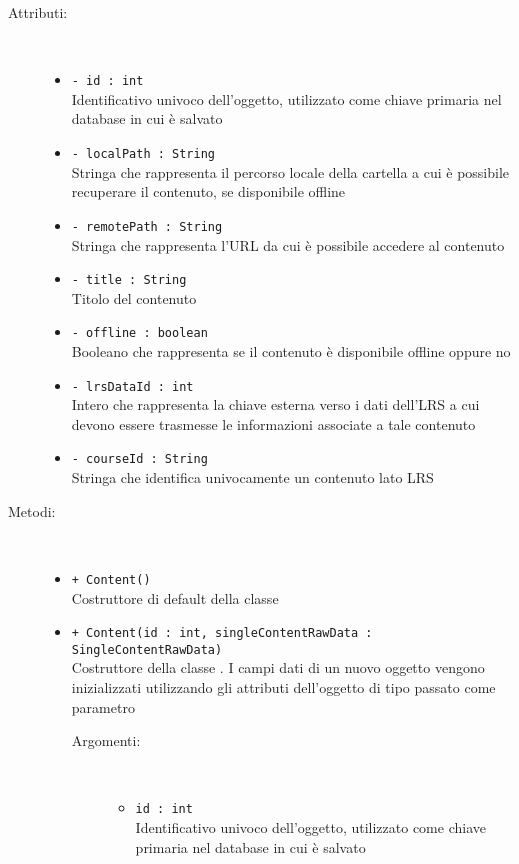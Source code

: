 \documentclass[../Tesi.tex]{subfiles}
\begin{document}
		\begin{description}
			\item[Attributi:] \
			\begin{itemize}
				\item \texttt{- id : int}\\
				Identificativo univoco dell'oggetto, utilizzato come chiave primaria nel database in cui è salvato

				\item \texttt{- localPath : String}\\
				Stringa che rappresenta il percorso locale della cartella a cui è possibile recuperare il contenuto, se disponibile offline

				\item \texttt{- remotePath : String}\\
				Stringa che rappresenta l'URL da cui è possibile accedere al contenuto

				\item \texttt{- title : String}\\
				Titolo del contenuto

				\item \texttt{- offline : boolean}\\
				Booleano che rappresenta se il contenuto è disponibile offline oppure no

				\item \texttt{- lrsDataId : int}\\
				Intero che rappresenta la chiave esterna verso i dati dell'LRS a cui devono essere trasmesse le informazioni associate a tale contenuto

				\item \texttt{- courseId : String}\\
				Stringa che identifica univocamente un contenuto lato LRS
			\end{itemize}

			\item[Metodi:] \
			\begin{itemize}
				\item \texttt{+ Content()}\\
				Costruttore di default della classe 

				\item \texttt{+ Content(id : int, singleContentRawData : \\SingleContentRawData)}\\
				Costruttore della classe . I campi dati di un nuovo oggetto vengono inizializzati utilizzando gli attributi dell'oggetto di tipo  passato come parametro
				\begin{description}
					\item[Argomenti:] \
					\begin{itemize}
						\item \texttt{id : int}\\
						Identificativo univoco dell'oggetto, utilizzato come chiave primaria nel database in cui è salvato


\end{itemize}
\end{description}
\end{itemize}
\end{description}
\end{document}
